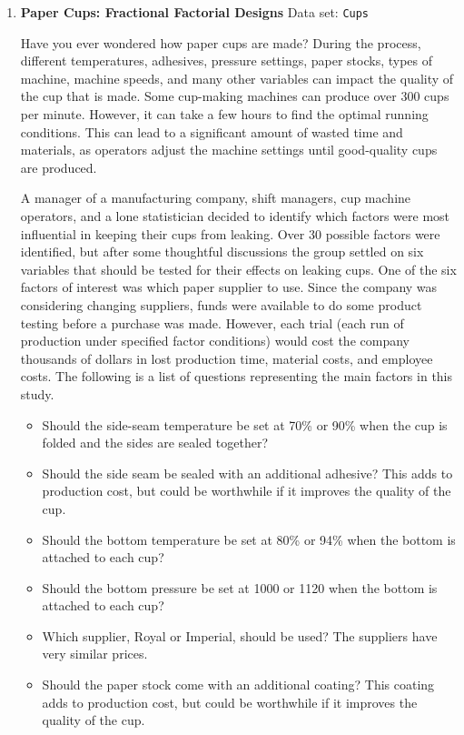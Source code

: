 \documentclass[
]{book}
\begin{document}
\begin{enumerate}
  \item \textbf{Paper Cups: Fractional Factorial Designs}
  Data set: \texttt{Cups}

Have you ever wondered how paper cups are made? During the process, different temperatures, adhesives, pressure settings, paper stocks, types of machine, machine speeds, and many other variables can impact the quality of the cup that is made. Some cup-making machines can produce over 300 cups per minute. However, it can take a few hours to find the optimal running conditions. This can lead to a significant amount of wasted time and materials, as operators adjust the machine settings until good-quality cups are produced.

A manager of a manufacturing company, shift managers, cup machine operators, and a lone statistician decided to identify which factors were most influential in keeping their cups from leaking. Over 30 possible factors were identified, but after some thoughtful discussions the group settled on six variables that should be tested for their effects on leaking cups. One of the six factors of interest was which paper supplier to use. Since the company was considering changing suppliers, funds were available to do some product testing before a purchase was made. However, each trial (each run of production under specified factor conditions) would cost the company thousands of dollars in lost production time, material costs, and employee costs. The following is a list of questions representing the main factors in this study.

  \begin{itemize}
    \item Should the side-seam temperature be set at 70\% or 90\% when the cup is folded and the sides are sealed together?
    \item Should the side seam be sealed with an additional adhesive? This adds to production cost, but could be worthwhile if it improves the quality of the cup.
    \item Should the bottom temperature be set at 80\% or 94\% when the bottom is attached to each cup?
    \item Should the bottom pressure be set at 1000 or 1120 when the bottom is attached to each cup?
    \item Which supplier, Royal or Imperial, should be used? The suppliers have very similar prices.
    \item Should the paper stock come with an additional coating? This coating adds to production cost, but could be worthwhile if it improves the quality of the cup.
    \end{itemize}


\end{enumerate}
\end{document}
